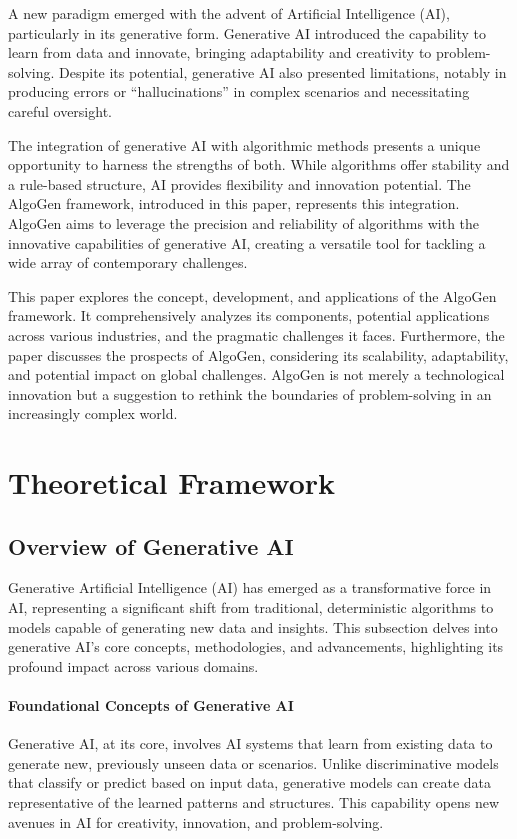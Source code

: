\documentclass{article}
\begin{document}
A new paradigm emerged with the advent of Artificial Intelligence (AI), particularly in its generative form. Generative AI introduced the capability to learn from data and innovate, bringing adaptability and creativity to problem-solving. Despite its potential, generative AI also presented limitations, notably in producing errors or “hallucinations” in complex scenarios and necessitating careful oversight.

The integration of generative AI with algorithmic methods presents a unique opportunity to harness the strengths of both. While algorithms offer stability and a rule-based structure, AI provides flexibility and innovation potential. The AlgoGen framework, introduced in this paper, represents this integration. AlgoGen aims to leverage the precision and reliability of algorithms with the innovative capabilities of generative AI, creating a versatile tool for tackling a wide array of contemporary challenges.

This paper explores the concept, development, and applications of the AlgoGen framework. It comprehensively analyzes its components, potential applications across various industries, and the pragmatic challenges it faces. Furthermore, the paper discusses the prospects of AlgoGen, considering its scalability, adaptability, and potential impact on global challenges. AlgoGen is not merely a technological innovation but a suggestion to rethink the boundaries of problem-solving in an increasingly complex world.


\section{Theoretical Framework}

\subsection{Overview of Generative AI}

Generative Artificial Intelligence (AI) has emerged as a transformative force in AI, representing a significant shift from traditional, deterministic algorithms to models capable of generating new data and insights. This subsection delves into generative AI's core concepts, methodologies, and advancements, highlighting its profound impact across various domains.

\paragraph{Foundational Concepts of Generative AI}
Generative AI, at its core, involves AI systems that learn from existing data to generate new, previously unseen data or scenarios. Unlike discriminative models that classify or predict based on input data, generative models can create data representative of the learned patterns and structures. This capability opens new avenues in AI for creativity, innovation, and problem-solving.
\end{document}
